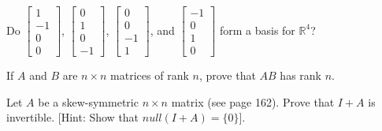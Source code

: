 \documentclass[11pt,letterpaper,boxed]{hmcpset}
\begin{document}
\begin{problem}[3.5 \#48]
    Do $\begin{bmatrix} 1 \\ -1 \\ 0\\ 0 \end{bmatrix}$, $\begin{bmatrix} 0 \\ 1 \\ 0\\ -1 \end{bmatrix}$, $\begin{bmatrix} 0 \\ 0 \\ -1\\ 1 \end{bmatrix}$, and $\begin{bmatrix} -1 \\ 0 \\ 1\\ 0 \end{bmatrix}$ form a basis for $\mathbb{R}^4$?
\end{problem}

\begin{solution}
    \vfill
\end{solution}

\newpage


\begin{problem}[3.5 \#58]
     If $A$ and $B$ are $n \times n$ matrices of rank $n$, prove that $AB$ has rank $n$.
\end{problem}

\begin{solution}
    \vfill
\end{solution}

\newpage


\begin{problem}[3.5 \# 66(b)]
    Let $A$ be a skew-symmetric $n \times n$ matrix (see page 162). Prove that $I + A$ is invertible. [Hint: Show that $null(I + A) = \{0\}$].
\end{problem}

\begin{solution}
    \vfill
\end{solution}

\newpage
\end{document}
